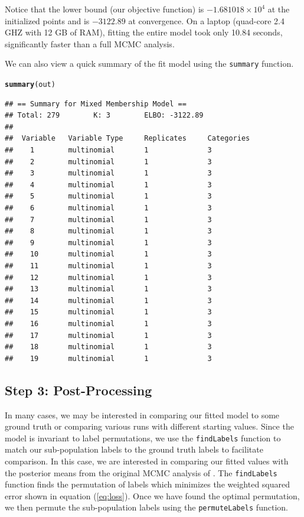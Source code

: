 \documentclass{article}\usepackage[]{graphicx}\usepackage[]{color}
\makeatletter
\newcommand{\hlstd}[1]{\textcolor[rgb]{0.345,0.345,0.345}{#1}}%
\newcommand{\hlkwd}[1]{\textcolor[rgb]{0.737,0.353,0.396}{\textbf{#1}}}%
\newenvironment{kframe}{%
 \def\at@end@of@kframe{}%
 \ifinner\ifhmode%
  \def\at@end@of@kframe{\end{minipage}}%
  \begin{minipage}{\columnwidth}%
 \fi\fi%
 \def\FrameCommand##1{\hskip\@totalleftmargin \hskip-\fboxsep
 \colorbox{shadecolor}{##1}\hskip-\fboxsep
     \hskip-\linewidth \hskip-\@totalleftmargin \hskip\columnwidth}%
 \MakeFramed {\advance\hsize-\width
   \@totalleftmargin\z@ \linewidth\hsize
   \@setminipage}}%
 {\par\unskip\endMakeFramed%
 \at@end@of@kframe}
\newenvironment{knitrout}{}{} %
\renewenvironment{knitrout}{\begin{singlespace}}{\end{singlespace}}
\makeatother
\begin{document}
Notice that the lower bound (our objective function) is \ensuremath{-1.681018\times 10^{4}} at the initialized points and is \ensuremath{-3122.89} at convergence. On a laptop (quad-core 2.4 GHZ with 12 GB of RAM), fitting the entire model took only 10.84 seconds, significantly faster than a full MCMC analysis. 

We can also view a quick summary of the fit model using the \texttt{summary} function.

\begin{knitrout}
\color{fgcolor}\begin{kframe}
\begin{alltt}
\hlkwd{summary}\hlstd{(out)}
\end{alltt}
\begin{verbatim}
## == Summary for Mixed Membership Model ==
## Total: 279		 K: 3		 ELBO: -3122.89
## 
##  Variable   Variable Type     Replicates     Categories  
##    1        multinomial       1              3           
##    2        multinomial       1              3           
##    3        multinomial       1              3           
##    4        multinomial       1              3           
##    5        multinomial       1              3           
##    6        multinomial       1              3           
##    7        multinomial       1              3           
##    8        multinomial       1              3           
##    9        multinomial       1              3           
##    10       multinomial       1              3           
##    11       multinomial       1              3           
##    12       multinomial       1              3           
##    13       multinomial       1              3           
##    14       multinomial       1              3           
##    15       multinomial       1              3           
##    16       multinomial       1              3           
##    17       multinomial       1              3           
##    18       multinomial       1              3           
##    19       multinomial       1              3
\end{verbatim}
\end{kframe}
\end{knitrout}

\subsection{Step 3: Post-Processing} \label{postProcess}
In many cases, we may be interested in comparing our fitted model to some ground truth or comparing various runs with different starting values. Since the model is invariant to label permutations, we use the \texttt{findLabels} function to match our sub-population labels to the ground truth labels to facilitate comparison. In this case, we are interested in comparing our fitted values with the posterior means from the original MCMC analysis of \cite{grossManriqueVallier}. The \texttt{findLabels} function finds the permutation of labels which minimizes the weighted squared error shown in equation (\ref{eq:loss}). Once we have found the optimal permutation, we then permute the sub-population labels using the \texttt{permuteLabels} function. 
\end{document}
